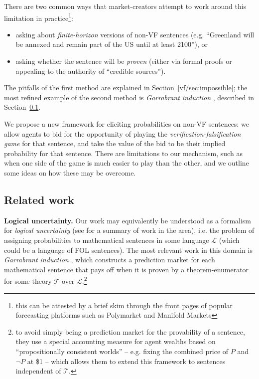 There are two common ways that market-creators attempt to work around this limitation in practice\footnote{this can be attested by a brief skim through the front pages of popular forecasting platforms such as Polymarket and Manifold Markets}:
\begin{itemize}
\item asking about \emph{finite-horizon} versions of non-VF sentences (e.g. ``Greenland will be annexed and remain part of the US until at least 2100''), or
\item asking whether the sentence will be \emph{proven} (either via formal proofs or appealing to the authority of ``credible sources'').
\end{itemize}
The pitfalls of the first method are explained in Section~\ref{vf/sec:impossible}; the most refined example of the second method is \emph{Garrabrant induction} \cite{garrabrantLogicalInduction2020}, described in Section~\ref{vf/sec:related}.

We propose a new framework for eliciting probabilities on non-VF sentences: we allow agents to bid for the opportunity of playing the \emph{verification-falsification game} for that sentence, and take the value of the bid to be their implied probability for that sentence. {There are limitations to our mechanism, such as when one side of the game is much easier to play than the other, and we outline some ideas on how these may be overcome.}


\subsection{Related work}
\label{vf/sec:related}

\textbf{Logical uncertainty.} Our work may equivalently be understood as a formalism for \emph{logical uncertainty} (see \cite{halpernReasoningUncertaintySecond2017} for a summary of work in the area), i.e. the problem of assigning probabilities to mathematical sentences in some language $\mathcal{L}$ (which could be a language of FOL sentences). The most relevant work in this domain is \emph{Garrabrant induction} \cite{garrabrantLogicalInduction2020}, which constructs a prediction market for each mathematical sentence that pays off when it is proven by a theorem-enumerator for some theory $\mathcal{T}$ over $\mathcal{L}$.\footnote{to avoid simply being a prediction market for the provability of a sentence, they use a special accounting measure for agent wealths based on ``propositionally consistent worlds'' -- e.g. fixing the combined price of $P$ and $\lnot P$ at \$1 -- which allows them to extend this framework to sentences independent of $\mathcal{T}$.}

